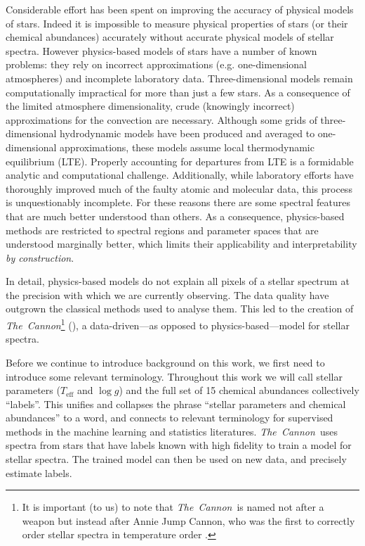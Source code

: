 \documentclass[12pt,preprint]{aastex6}
\newcommand{\project}[1]{\textsl{#1}}
\newcommand{\TheCannon}{\project{The~Cannon}}
\newcommand{\logg}{\log g}
\newcommand{\Teff}{T_{\mathrm{eff}}}
\begin{document}
Considerable effort has  been spent on improving the accuracy of physical
models of stars.  Indeed it is impossible to measure physical properties of stars (or 
their chemical abundances) accurately without accurate physical models of 
stellar spectra.  However physics-based models of stars have a number of known
problems: they rely on incorrect approximations (e.g. one-dimensional atmospheres) and incomplete laboratory data.
Three-dimensional models remain computationally impractical for more than just a
few stars.  As a consequence of the limited atmosphere dimensionality, crude 
(knowingly incorrect) approximations for the convection are 
necessary.  Although some grids of three-dimensional hydrodynamic models have been 
produced and averaged to one-dimensional approximations, these models assume 
local thermodynamic equilibrium (LTE).  Properly accounting for departures from 
LTE is a formidable analytic and computational challenge.  Additionally, while 
laboratory efforts have thoroughly improved much of the faulty atomic and 
molecular data, this process is unquestionably incomplete.  For these reasons 
there are some spectral features that are much better understood than others.  
As a consequence, physics-based methods are restricted to spectral regions and
parameter spaces that are understood marginally better, which limits 
their applicability and interpretability \emph{by construction}.


In detail, physics-based models do not explain all pixels of a stellar 
spectrum at the precision with which we are currently observing.  The data
quality have outgrown the classical methods used to analyse them.  This led to the creation of
\TheCannon\footnote{It is important (to us) to note that \TheCannon\ is named 
not after a weapon but instead after Annie Jump Cannon, who was the first to 
correctly order stellar spectra in temperature order \citep[and who did
so by looking at the data, and without any use of physics-based models, see, e.g.,][]
{Cannon_1912}.} (\citealt{tc}), a data-driven---as opposed to 
physics-based---model for stellar spectra. 


Before we continue to introduce background on this work, we first need to
introduce some relevant terminology.  Throughout this work we will call stellar 
parameters ($\Teff$ and $\logg$) and the full set of 15 chemical abundances 
collectively ``labels''.  This unifies and collapses the phrase ``stellar
parameters and chemical abundances'' to a word, and connects to relevant 
terminology for supervised methods in the machine learning and statistics 
literatures.  \TheCannon\ uses spectra from stars that have labels known
with high fidelity to train a model for stellar spectra.  The trained model can
then be used on new data, and precisely estimate labels.
\end{document}
